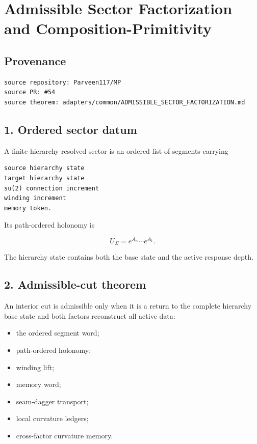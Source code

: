 \hypertarget{admissible-sector-factorization-and-composition-primitivity}{%
\chapter{Admissible Sector Factorization and Composition-Primitivity}\label{admissible-sector-factorization-and-composition-primitivity}}

\hypertarget{provenance}{%
\section{Provenance}\label{provenance}}

\begin{verbatim}
source repository: Parveen117/MP
source PR: #54
source theorem: adapters/common/ADMISSIBLE_SECTOR_FACTORIZATION.md
\end{verbatim}

\hypertarget{ordered-sector-datum}{%
\section{1. Ordered sector datum}\label{ordered-sector-datum}}

A finite hierarchy-resolved sector is an ordered list of segments carrying

\begin{verbatim}
source hierarchy state
target hierarchy state
su(2) connection increment
winding increment
memory token.
\end{verbatim}

Its path-ordered holonomy is

\[
U_\Sigma=e^{A_n}\cdots e^{A_1}.
\]

The hierarchy state contains both the base state and the active response depth.

\hypertarget{admissible-cut-theorem}{%
\section{2. Admissible-cut theorem}\label{admissible-cut-theorem}}

An interior cut is admissible only when it is a return to the complete hierarchy base state and both factors reconstruct all active data:

\begin{itemize}
\tightlist
\item
  the ordered segment word;
\item
  path-ordered holonomy;
\item
  winding lift;
\item
  memory word;
\item
  seam-dagger transport;
\item
  local curvature ledgers;
\item
  cross-factor curvature memory.
\end{itemize}

